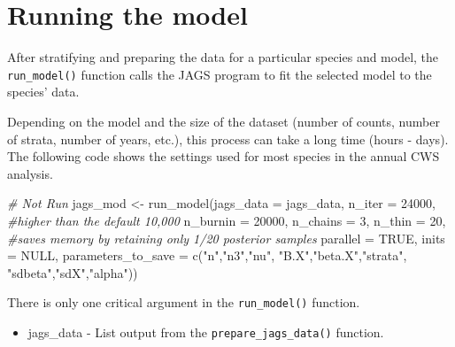 \documentclass[
]{book}
\newenvironment{Shaded}{\begin{snugshade}}{\end{snugshade}}
\newcommand{\AttributeTok}[1]{\textcolor[rgb]{0.77,0.63,0.00}{#1}}
\newcommand{\CommentTok}[1]{\textcolor[rgb]{0.56,0.35,0.01}{\textit{#1}}}
\newcommand{\ConstantTok}[1]{\textcolor[rgb]{0.00,0.00,0.00}{#1}}
\newcommand{\DecValTok}[1]{\textcolor[rgb]{0.00,0.00,0.81}{#1}}
\newcommand{\FunctionTok}[1]{\textcolor[rgb]{0.00,0.00,0.00}{#1}}
\newcommand{\NormalTok}[1]{#1}
\newcommand{\OtherTok}[1]{\textcolor[rgb]{0.56,0.35,0.01}{#1}}
\newcommand{\StringTok}[1]{\textcolor[rgb]{0.31,0.60,0.02}{#1}}
\providecommand{\tightlist}{%
  \setlength{\itemsep}{0pt}\setlength{\parskip}{0pt}}
\begin{document}
\hypertarget{ModelRun}{%
\chapter{Running the model}\label{ModelRun}}

After stratifying and preparing the data for a particular species and model, the \texttt{run\_model()} function calls the JAGS program to fit the selected model to the species' data.

Depending on the model and the size of the dataset (number of counts, number of strata, number of years, etc.), this process can take a long time (hours - days). The following code shows the settings used for most species in the annual CWS analysis.

\begin{Shaded}
\begin{Highlighting}[]
\CommentTok{\# Not Run}
\NormalTok{jags\_mod }\OtherTok{\textless{}{-}} \FunctionTok{run\_model}\NormalTok{(}\AttributeTok{jags\_data =}\NormalTok{ jags\_data,}
                      \AttributeTok{n\_iter =} \DecValTok{24000}\NormalTok{, }\CommentTok{\#higher than the default 10,000}
                      \AttributeTok{n\_burnin =} \DecValTok{20000}\NormalTok{,}
                      \AttributeTok{n\_chains =} \DecValTok{3}\NormalTok{,}
                      \AttributeTok{n\_thin =} \DecValTok{20}\NormalTok{, }\CommentTok{\#saves memory by retaining only 1/20 posterior samples}
                      \AttributeTok{parallel =} \ConstantTok{TRUE}\NormalTok{,}
                      \AttributeTok{inits =} \ConstantTok{NULL}\NormalTok{,}
                      \AttributeTok{parameters\_to\_save =} \FunctionTok{c}\NormalTok{(}\StringTok{"n"}\NormalTok{,}\StringTok{"n3"}\NormalTok{,}\StringTok{"nu"}\NormalTok{,}
                                             \StringTok{"B.X"}\NormalTok{,}\StringTok{"beta.X"}\NormalTok{,}\StringTok{"strata"}\NormalTok{,}
                                             \StringTok{"sdbeta"}\NormalTok{,}\StringTok{"sdX"}\NormalTok{,}\StringTok{"alpha"}\NormalTok{))}
 
\end{Highlighting}
\end{Shaded}

There is only one critical argument in the \texttt{run\_model()} function.

\begin{itemize}
\tightlist
\item
  jags\_data - List output from the \texttt{prepare\_jags\_data()} function.
\end{itemize}
\end{document}
